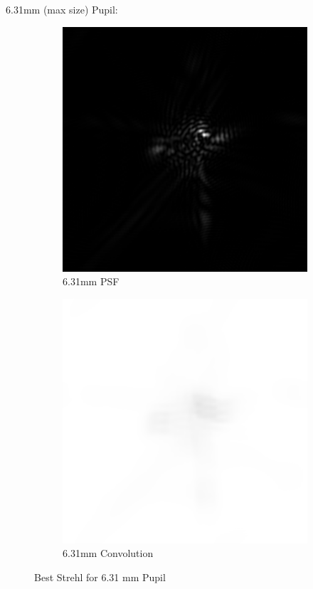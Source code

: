 \documentclass{article}
\begin{document}
6.31mm (max size) Pupil:
\begin{figure}[H]
\begin{subfigure}{.25\textwidth}
  \centering
  \includegraphics[width=1\linewidth]{Vasha_R_G_0530_2_631_zer_05_63167_PSF.png}
  \caption{6.31mm PSF}
  \label{fig:631mmStrehlpsf}
\end{subfigure}%
\begin{subfigure}{.25\textwidth}
  \centering
  \includegraphics[width=1\linewidth]{Vasha_R_G_0530_2_631_zer_05_63167_PSF_convE.png}
  \caption{6.31mm Convolution}
  \label{fig:631mmStrehlconv}
\end{subfigure}
\caption{Best Strehl for 6.31 mm Pupil}
\label{fig:631mmStrehl}
\end{figure}
\end{document}
